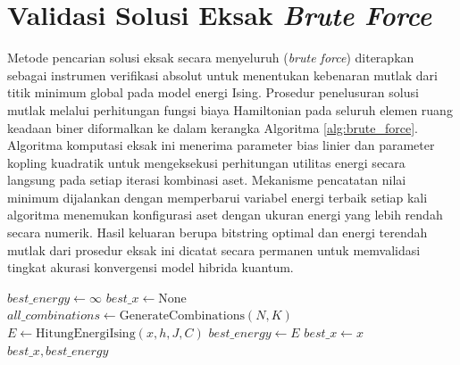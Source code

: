 \section{Validasi Solusi Eksak \textit{Brute Force}}
Metode pencarian solusi eksak secara menyeluruh (\textit{brute force}) diterapkan sebagai instrumen verifikasi absolut untuk menentukan kebenaran mutlak dari titik minimum global pada model energi Ising. Prosedur penelusuran solusi mutlak melalui perhitungan fungsi biaya Hamiltonian pada seluruh elemen ruang keadaan biner diformalkan ke dalam kerangka Algoritma \ref{alg:brute_force}. Algoritma komputasi eksak ini menerima parameter bias linier dan parameter kopling kuadratik untuk mengeksekusi perhitungan utilitas energi secara langsung pada setiap iterasi kombinasi aset. Mekanisme pencatatan nilai minimum dijalankan dengan memperbarui variabel energi terbaik setiap kali algoritma menemukan konfigurasi aset dengan ukuran energi yang lebih rendah secara numerik. Hasil keluaran berupa bitstring optimal dan energi terendah mutlak dari prosedur eksak ini dicatat secara permanen untuk memvalidasi tingkat akurasi konvergensi model hibrida kuantum.

\begin{algorithm}[ht]
\caption{Pencarian Solusi Eksak secara Menyeluruh}
\label{alg:brute_force}
\begin{algorithmic}[1]
    \State $best\_energy \gets \infty$
    \State $best\_x \gets \text{None}$
    \State $all\_combinations \gets \text{GenerateCombinations}(N, K)$
        \State $E \gets \text{HitungEnergiIsing}(x, h, J, C)$ 
            \State $best\_energy \gets E$
            \State $best\_x \gets x$
        \EndIf
    \EndFor
    \State \Return $best\_x, best\_energy$
\EndProcedure
\end{algorithmic}
\end{algorithm}
